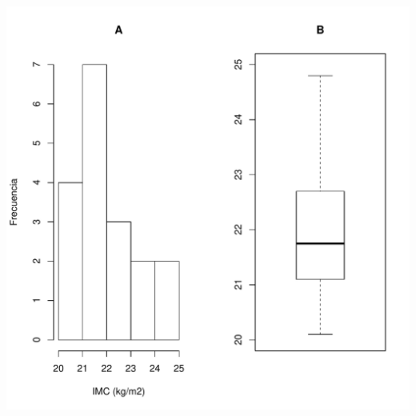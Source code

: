 \documentclass[10pt,a4paper]{article}\usepackage[]{graphicx}\usepackage[]{color}
\makeatletter
\def\maxwidth{ %
  \ifdim\Gin@nat@width>\linewidth
    \linewidth
  \else
    \Gin@nat@width
  \fi
}
\newenvironment{knitrout}{}{} %
\makeatother
\begin{document}
\begin{knitrout}
\includegraphics[width=\maxwidth]{figure/unnamed-chunk-1-1} 

\end{knitrout}
\end{document}
